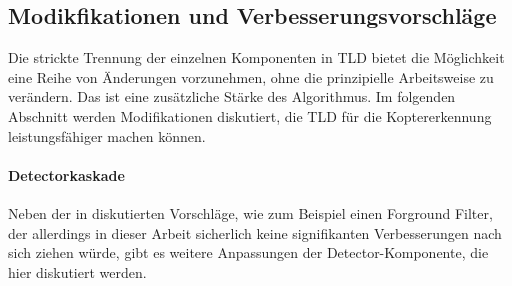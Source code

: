 
\subsection{Modikfikationen und Verbesserungsvorschläge}
	Die strickte Trennung der einzelnen Komponenten in TLD bietet die Möglichkeit eine Reihe von Änderungen vorzunehmen, ohne die prinzipielle Arbeitsweise zu verändern. Das ist eine zusätzliche Stärke des Algorithmus. Im folgenden Abschnitt werden Modifikationen diskutiert, die TLD für die Koptererkennung leistungsfähiger machen können.

	\paragraph{Detectorkaskade}
	Neben der in \cite{TLD} diskutierten Vorschläge, wie zum Beispiel einen Forground Filter, der allerdings in dieser Arbeit sicherlich keine signifikanten Verbesserungen nach sich ziehen würde, gibt es weitere Anpassungen der Detector-Komponente, die hier diskutiert werden.

